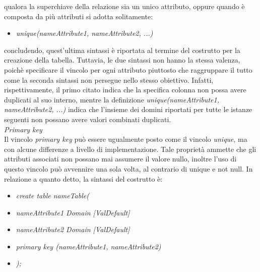 \documentclass{article}
\begin{document}
qualora la superchiave della relazione sia un unico attributo, oppure quando è composta da più attributi si adotta solitamente:
\begin{itemize}[label={ }, leftmargin=1cm]
    \item \textit{unique(nameAttribute1, nameAttribute2, ...)}
\end{itemize}
concludendo, quest'ultima sintassi è riportata al termine del costrutto per la creazione della tabella. Tuttavia, le due sintassi non hanno la stessa valenza, poichè specificare il vincolo per ogni attributo piuttosto che raggruppare il tutto come la seconda sintassi non persegue nello stesso obiettivo. Infatti, rispettivamente, il primo citato indica che la specifica colonna non possa avere duplicati al suo interno, mentre la definizione \textit{unique(nameAttribute1, nameAttribute2, ...)} indica che l'insieme dei domini riportati per tutte le istanze seguenti non possano avere valori combinati duplicati.\vspace*{14pt}\\
\textit{Primary key}\\Il vincolo \textit{primary key} può essere ugualmente posto come il vincolo \textit{unique}, ma con alcune differenze a livello di implementazione. Tale proprietà ammette che gli attributi associati non possano mai assumere il valore nullo, inoltre l'uso di questo vincolo può avvennire una sola volta, al contrario di unique e not null. In relazione a quanto detto, la sintassi del costrutto è:
\begin{itemize}[label={ }, leftmargin=1cm]
    \item \textit{create table nameTable(}
\end{itemize}
\begin{itemize}[label={ }, leftmargin=2cm]
    \itemsep0em
    \item \textit{nameAttribute1 Domain [ValDefault]}
    \item \textit{nameAttribute2 Domain [ValDefault]}
    \item \textit{primary key (nameAttribute1, nameAttribute2)}
\end{itemize}
\begin{itemize}[label={ }, leftmargin=1cm]
    \item \textit{);}
\end{itemize}
\end{document}
